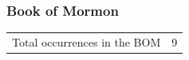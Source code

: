 						
						
						
						
						
						
						
		
	\subsubsection{Book of Mormon} %
		\label{CONTRITE-BOM}
	
		\begin{tabular}{ll}
			Total occurrences in the BOM & 9
		\end{tabular}
		
